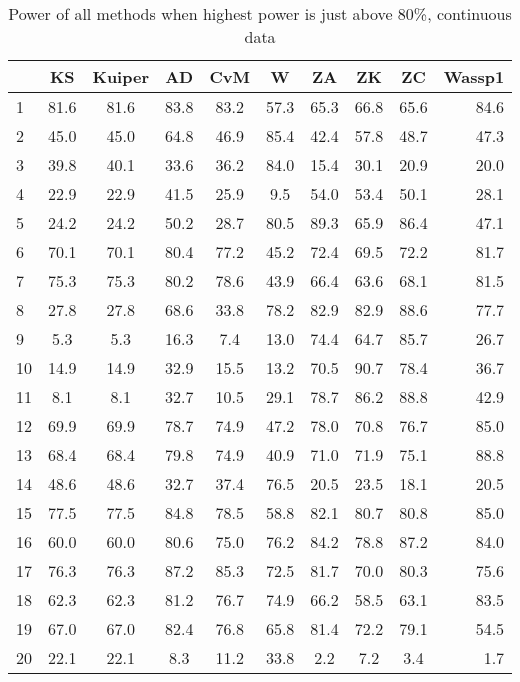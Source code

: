 \documentclass[]{svjour3}
\begin{document}
\begin{table}[H]
\begin{center}
\caption{Power of all methods when highest power is just above 80\%, continuous data}
\label{tab:table4}
\begin{tabular}{l|c|c|c|c|c|c|c|c|r}
 & KS & Kuiper & AD & CvM &  W & ZA & ZK & ZC & Wassp1\\
\hline
1 & 81.6 & 81.6 & 83.8 & 83.2 & 57.3 & 65.3 & 66.8 & 65.6 & 84.6 \\
2 & 45.0 & 45.0 & 64.8 & 46.9 & 85.4 & 42.4 & 57.8 & 48.7 & 47.3 \\
3 & 39.8 & 40.1 & 33.6 & 36.2 & 84.0 & 15.4 & 30.1 & 20.9 & 20.0 \\
4 & 22.9 & 22.9 & 41.5 & 25.9 & 9.5 & 54.0 & 53.4 & 50.1 & 28.1 \\
5 & 24.2 & 24.2 & 50.2 & 28.7 & 80.5 & 89.3 & 65.9 & 86.4 & 47.1 \\
6 & 70.1 & 70.1 & 80.4 & 77.2 & 45.2 & 72.4 & 69.5 & 72.2 & 81.7 \\
7 & 75.3 & 75.3 & 80.2 & 78.6 & 43.9 & 66.4 & 63.6 & 68.1 & 81.5 \\
8 & 27.8 & 27.8 & 68.6 & 33.8 & 78.2 & 82.9 & 82.9 & 88.6 & 77.7 \\
9 & 5.3 & 5.3 & 16.3 & 7.4 & 13.0 & 74.4 & 64.7 & 85.7 & 26.7 \\
10 & 14.9 & 14.9 & 32.9 & 15.5 & 13.2 & 70.5 & 90.7 & 78.4 & 36.7 \\
11 & 8.1 & 8.1 & 32.7 & 10.5 & 29.1 & 78.7 & 86.2 & 88.8 & 42.9 \\
12 & 69.9 & 69.9 & 78.7 & 74.9 & 47.2 & 78.0 & 70.8 & 76.7 & 85.0 \\
13 & 68.4 & 68.4 & 79.8 & 74.9 & 40.9 & 71.0 & 71.9 & 75.1 & 88.8 \\
14 & 48.6 & 48.6 & 32.7 & 37.4 & 76.5 & 20.5 & 23.5 & 18.1 & 20.5 \\
15 & 77.5 & 77.5 & 84.8 & 78.5 & 58.8 & 82.1 & 80.7 & 80.8 & 85.0 \\
16 & 60.0 & 60.0 & 80.6 & 75.0 & 76.2 & 84.2 & 78.8 & 87.2 & 84.0 \\
17 & 76.3 & 76.3 & 87.2 & 85.3 & 72.5 & 81.7 & 70.0 & 80.3 & 75.6 \\
18 & 62.3 & 62.3 & 81.2 & 76.7 & 74.9 & 66.2 & 58.5 & 63.1 & 83.5 \\
19 & 67.0 & 67.0 & 82.4 & 76.8 & 65.8 & 81.4 & 72.2 & 79.1 & 54.5 \\
20 & 22.1 & 22.1 & 8.3 & 11.2 & 33.8 & 2.2 & 7.2 & 3.4 & 1.7 \\
\end{tabular}
\end{center}
\end{table}
\end{document}
